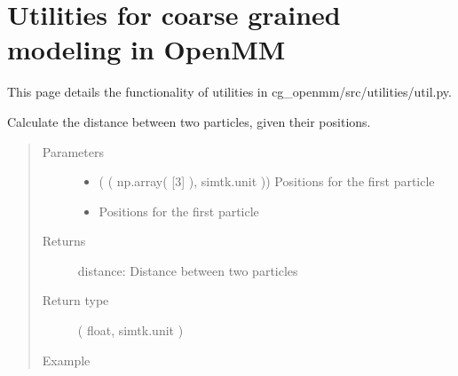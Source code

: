 \documentclass[letterpaper,12pt,english,openany,oneside]{sphinxmanual}
\begin{document}
\chapter{Utilities for coarse grained modeling in OpenMM}
\label{\detokenize{utilities:utilities-for-coarse-grained-modeling-in-openmm}}\label{\detokenize{utilities::doc}}
This page details the functionality of utilities in cg\_openmm/src/utilities/util.py.

\label{\detokenize{utilities:module-utilities.util}}

\begin{fulllineitems}
\label{\detokenize{utilities:utilities.util.distance}}
Calculate the distance between two particles, given their positions.
\begin{quote}\begin{description}
\item[{Parameters}] \leavevmode\begin{itemize}
\item {} 
 ( ( np.array( {[}3{]} ), simtk.unit )) \textendash{} Positions for the first particle

\item {} 
 \textendash{} Positions for the first particle

\end{itemize}

\item[{Returns}] \leavevmode
distance: Distance between two particles

\item[{Return type}] \leavevmode

 ( float, simtk.unit )


\item[{Example}] \leavevmode
\end{description}\end{quote}


\end{fulllineitems}
\end{document}

